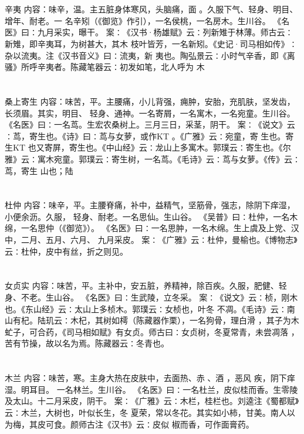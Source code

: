 \documentclass[12pt,UTF8]{ctexbook}
\begin{document}
\section{}辛夷
内容：味辛，温。主五脏身体寒风，头脑痛，面 。久服下气、轻身、明目、增年、耐老。一 
名辛矧（《御览》作引），一名侯桃，一名房木。生川谷。 
《名医》曰∶九月采实，曝干。 
案∶《汉书·杨雄赋》云∶列新雉于林薄。师古云∶新雉，即辛夷耳，为树甚大，其木 
枝叶皆芳，一名新矧。《史记·司马相如传》∶杂以流夷。注《汉书音义》曰∶流夷，新 
夷也。陶弘景云∶小时气辛香，即《离骚》所呼辛夷者。陈藏笔器云∶初发如笔，北人呼为 
木 


\section{}桑上寄生
内容：味苦，平。主腰痛，小儿背强，痈肿，安胎，充肌肤，坚发齿，长须眉。其实，明目、 
轻身、通神。一名寄屑，一名寓木，一名宛童。生川谷。 
《名医》曰∶一名茑。生宏农桑树上。三月三日，采茎，阴干。 
案∶《说文》云∶茑，寄生也。《诗》曰∶茑与女萝，或作KT 。《广雅》云∶宛童，寄 
生也。寄生KT 也又寄屏，寄生也。《中山经》云∶龙山上多寓木。郭璞云∶寄生也。《尔 
雅》云∶寓木宛童。郭璞云∶寄生树，一名茑。《毛诗》云∶茑与女萝。《传》云∶茑，寄生 
山也；陆 


\section{}杜仲
内容：味辛，平。主腰脊痛，补中，益精气，坚筋骨，强志，除阴下痒湿，小便余沥。久服， 
轻身、耐老。一名思仙。生山谷。 
《吴普》曰∶杜仲，一名木绵，一名思仲（《御览》）。 
《名医》曰∶一名思肿，一名木绵。生上虞及上党、汉中，二月、五月、六月、 
九月采皮。 
案∶《广雅》云∶杜仲，曼榆也。《博物志》云∶杜仲，皮中有丝，折之则见。 


\section{}女贞实
内容：味苦，平。主补中，安五脏，养精神，除百疾。久服，肥健、轻身、不老。生山谷。 
《名医》曰∶生武陵，立冬采。 
案∶《说文》云∶桢，刚木也。《东山经》云∶太山上多桢木。郭璞云∶女桢也，叶冬 
不凋。《毛诗》云∶南山有杞。陆玑云∶木杞，其树如樗（陈藏器作栗），一名狗骨，理白滑 
，其子为木虻子，可合药，《司马相如赋》有女贞。师古曰∶女贞树，冬夏常青，未尝凋落 
，苦有节操，故以名为焉。陈藏器云∶冬青也。 


\section{}木兰
内容：味苦，寒。主身大热在皮肤中，去面热、赤 、酒 ，恶风 疾，阴下痒湿。明耳目。 
一名林兰。生川谷。 
《名医》曰∶一名杜兰，皮似桂而香。生零陵及太山。十二月采皮，阴干。 
案∶《广雅》云∶木栏，桂栏也。刘逵注《蜀都赋》云∶木兰，大树也，叶似长生，冬 
夏荣，常以冬花。其实如小柿，甘美。南人以为梅，其皮可食。颜师古注《汉书》云∶皮似 
椒而香，可作面膏药。 
\end{document}
